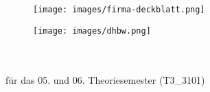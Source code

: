 


\begin{titlepage}
    
    \centering
    \begin{figure}[t]
        \begin{minipage}[]{0.49\textwidth}
            \begin{flushleft}
                \texttt{[image: images/firma-deckblatt.png]}
            \end{flushleft}
        \end{minipage}
        \begin{minipage}[]{0.49\textwidth}
            \begin{flushright}
                \texttt{[image: images/dhbw.png]}
            \end{flushright}
        \end{minipage}
    \end{figure}
    
    \enlargethispage{20mm}
    
    \begin{center}
        \vspace*{6mm}	{\arbeit}\\
        \doublespacing
        \vspace*{12mm}	{\LARGE\textbf{{\titel}}}\\
        \onehalfspacing
        \vspace*{24mm}	für das 05. und 06. Theoriesemester (T3\_3101)\\
        \vspace*{3mm}		\langartikelstudiengang{} \langstudiengang{} \textbf{\studiengang}\\
        \vspace*{3mm}		\langanderdh{} \dhbw\\
        \vspace*{7mm}	\langvon\\
        \vspace*{3mm}		{\large\textbf \autor}\\
        \vspace*{7mm}	\datumAbgabe\\
    \end{center}
    

\end{titlepage}
